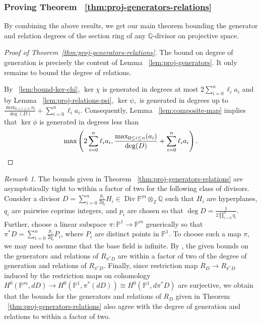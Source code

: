 \documentclass{amsart}
\theoremstyle{plain}
\theoremstyle{definition}
\theoremstyle{remark}
\newtheorem{rem}[thm]{Remark}
\numberwithin{equation}{section}
\newcommand\sssec{\subsubsection}
\newcommand\bq{{\mathbb Q}}
\newcommand\bp{{\mathbb P}}
\newcommand\bz{{\mathbb Z}}
\DeclareMathOperator\di{Div}
\newcommand\bida{a}
\begin{document}
\sssec*{Proving Theorem ~\ref{thm:proj-generators-relations}}
\label{sssec:proving-theorem-proj}
By combining the above results, we get our main theorem bounding
the generator and relation degrees of the section ring of any
$\bq$-divisor on projective space.


\begin{proof}[Proof of Theorem~\ref{thm:proj-generators-relations}]
The bound on degree of generation is precisely the content of Lemma 
~\ref{lem:proj-generators}. It only remains to bound the degree of 
relations.

By ~\ref{lem:bound-ker-chi}, $\ker \chi$ is generated in degrees 
at most $2\sum_{i=0}^n \ell_i a_i$ and by Lemma
~\ref{lem:proj-relations-psi}, $\ker \psi,$ is generated in
degrees up to $\frac{\max_{0 \leq i \leq n} \bida_i}{\deg(D)} + \sum_{i=0}^n \ell_i a_i$. 
Consequently, Lemma ~\ref{lem:composite-map} implies that $\ker \phi$
is generated in degrees less than
\[
	\max \left(2 \sum_{i=0}^n \ell_i a_i, \frac{\max_{0 \le i \le n}
	(\bida_i)}{\deg(D)} + \sum_{i=0}^n \ell_i a_i \right).
	\qedhere
\]
\end{proof}

\begin{rem}
\label{rem:exact-noneff-bounds}
The bounds given in Theorem 
~\ref{thm:proj-generators-relations} are asymptotically
tight to within a factor of two 
for the following class of divisors. Consider
a divisor 
$ D = \sum_{i=0}^n\frac{p_i}{2q_i}H_i \in \di \bp^m \otimes_\bz \bq$
such that $H_i$ are hyperplanes,  
$q_i$ are pairwise coprime integers, and $p_i$ are chosen
so that $\deg D = \frac{1}{2 \prod_{i=0}^n q_i}$. Further,
choose a linear subspace $\pi: \bp^1 \rightarrow \bp^m$  generically so that
$\pi^* D = \sum_{i=0}^n \frac{p_i}{2q_i}P_i$, 
where $P_i$ are distinct points in $\bp^1$. To choose such a map
$\pi$, we may need to assume that the base field is infinite.
By
\cite[Remark, p. 9]{dorney:canonical},
the given bounds on the generators and relations of
$R_{\pi^*D}$ are within
a factor of two of the degree of generation and relations of
$R_{\pi^*D}$. Finally, since restriction map
$R_D \rightarrow R_{\pi^*D}$ induced by the restriction maps
on cohomology $H^0(\bp^m, dD) \rightarrow H^0(\bp^1, \pi^*(dD))
\cong H^0(\bp^1, d\pi^* D)$ are surjective, we obtain that
the bounds for the generators and relations of $R_D$ given in
Theorem ~\ref{thm:proj-generators-relations} also
agree with the degree of generation and relations 
to within a factor of two.
\end{rem}
\end{document}
